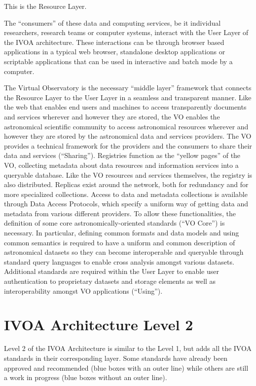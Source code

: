\documentclass[11pt,letter]{ivoa}
\begin{document}
This is the Resource Layer. 

The ``consumers'' of these data and computing services, be it individual
researchers,
research teams or computer systems, interact with the User Layer of the
IVOA architecture.
These interactions can be through browser based applications in a
typical web browser,
standalone desktop applications or scriptable applications that can be
used in interactive
and batch mode by a computer. 

The Virtual Observatory is the necessary ``middle layer'' framework that
connects the
Resource Layer to the User Layer in a seamless and transparent manner.
Like the web
that enables end users and machines to access transparently documents
and services
wherever and however they are stored, the VO enables the astronomical
scientific community
to access astronomical resources wherever and however they are stored by
the astronomical
data and services providers. The VO provides a technical framework for
the providers and
the consumers to share their data and services (``Sharing''). Registries
function as the ``yellow
pages'' of the VO, collecting metadata about data resources and
information services into a
queryable database. Like the VO resources and services themselves, the
registry is also
distributed. Replicas exist around the network, both for redundancy and
for more specialized
collections. Access to data and metadata collections is available
through Data Access Protocols,
which specify a uniform way of getting data and metadata from various
different providers.
To allow these functionalities, the definition of some core
astronomically-oriented standards
(``VO Core'') is necessary. In particular, defining common formats and
data models and using
common semantics is required to have a uniform and common description of
astronomical datasets
so they can become interoperable and queryable through standard query
languages to enable cross
analysis amongst various datasets. Additional standards are required
within the User Layer to enable
user authentication to proprietary datasets and storage elements as well
as interoperability amongst
VO applications (``Using'').

\section{IVOA Architecture Level 2}

Level 2 of the IVOA Architecture is similar to the Level 1, but adds all
the IVOA
standards in their corresponding layer. Some standards have already been
approved
and recommended (blue boxes with an outer line) while others are still a
work in progress
(blue boxes without an outer line).
\end{document}
